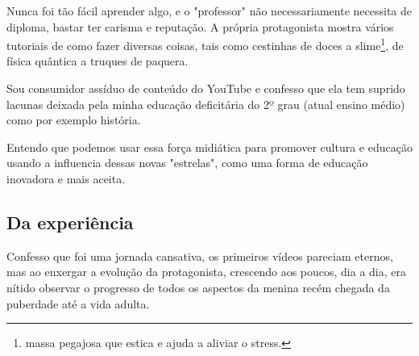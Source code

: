 Nunca foi tão fácil aprender algo, e o "professor"  não necessariamente necessita de diploma, bastar ter carisma e reputação. A própria protagonista mostra vários tutoriais de como fazer diversas coisas, tais como cestinhas de doces a slime\footnote{ massa pegajosa que estica e ajuda a aliviar o stress.}, de física quântica a truques de paquera.

Sou consumidor assíduo de conteúdo do YouTube e confesso que ela tem suprido lacunas deixada pela minha educação deficitária do 2º grau (atual ensino médio) como por exemplo história.

Entendo que podemos usar essa força midiática para promover cultura e educação usando a influencia dessas novas "estrelas", como uma forma de educação inovadora e mais aceita.

\subsection{Da experiência}

Confesso que foi uma jornada cansativa, os primeiros vídeos pareciam eternos, mas ao enxergar a evolução da protagonista, crescendo aos poucos, dia a dia, era nítido observar o progresso de todos os aspectos da menina recém chegada da puberdade até a vida adulta.